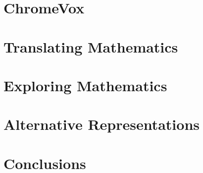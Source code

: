\documentclass{sig-alternate}
\begin{document}
\section{ChromeVox}
\label{sec:chromevox}

\section{Translating Mathematics}
\label{sec:translate}

\section{Exploring Mathematics}
\label{sec:explore}

\section{Alternative Representations}
\label{sec:alternative}

\section{Conclusions}
\label{sec:conc}



  
\end{document}
